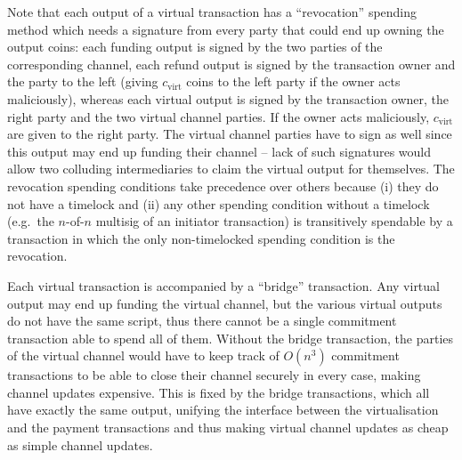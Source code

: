   Note that each output of a virtual transaction has a ``revocation'' spending
  method which needs a signature from every party that could end up owning the
  output coins: each funding output is signed by the two parties of the
  corresponding channel, each refund output is signed by the transaction owner
  and the party to the left (giving $c_{\mathrm{virt}}$ coins to the left party
  if the owner acts maliciously), whereas each virtual output is signed by the
  transaction owner, the right party and the two virtual channel parties. If the
  owner acts maliciously, $c_{\mathrm{virt}}$ are given to the right party. The
  virtual channel parties have to sign as well since this output may end up
  funding their channel -- lack of such signatures would allow two colluding
  intermediaries to claim the virtual output for themselves. The revocation
  spending conditions take precedence over others because (i) they do not have a
  timelock and (ii) any other spending condition without a timelock (e.g.\ the
  $n$-of-$n$ multisig of an initiator transaction) is transitively spendable by
  a transaction in which the only non-timelocked spending condition is the
  revocation.

  Each virtual transaction is accompanied by a ``bridge'' transaction. Any
  virtual output may end up funding the virtual channel, but the various virtual
  outputs do not have the same script, thus there cannot be a single commitment
  transaction able to spend all of them. Without the bridge transaction, the
  parties of the virtual channel would have to keep track of $O(n^3)$ commitment
  transactions to be able to close their channel securely in every case, making
  channel updates expensive. This is fixed by the bridge transactions, which all
  have exactly the same output, unifying the interface between the
  virtualisation and the payment transactions and thus making virtual channel
  updates as cheap as simple channel updates.

